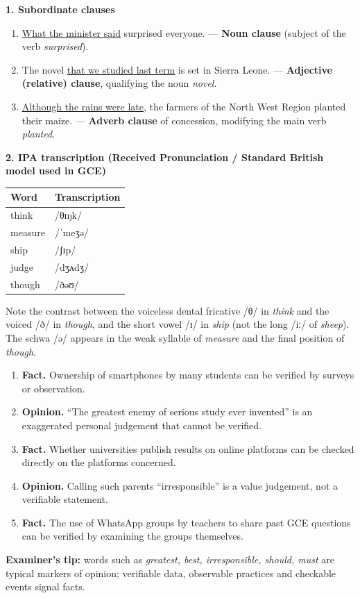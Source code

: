 \documentclass[11pt]{article}
\begin{document}
\begin{corrige}
\textbf{1. Subordinate clauses}
\begin{enumerate}
\item \underline{What the minister said} surprised everyone. — \textbf{Noun clause} (subject of the verb \emph{surprised}).
\item The novel \underline{that we studied last term} is set in Sierra Leone. — \textbf{Adjective (relative) clause}, qualifying the noun \emph{novel}.
\item \underline{Although the rains were late}, the farmers of the North West Region planted their maize. — \textbf{Adverb clause} of concession, modifying the main verb \emph{planted}.
\end{enumerate}
\textbf{2. IPA transcription (Received Pronunciation / Standard British model used in GCE)}
\begin{center}
\begin{tabular}{|l|l|}
\hline
\rowcolor{popblueL} \textbf{Word} & \textbf{Transcription} \\
\hline
think & /θɪŋk/ \\
\hline
measure & /ˈmeʒə/ \\
\hline
ship & /ʃɪp/ \\
\hline
judge & /dʒʌdʒ/ \\
\hline
though & /ðəʊ/ \\
\hline
\end{tabular}
\end{center}
Note the contrast between the voiceless dental fricative /θ/ in \emph{think} and the voiced /ð/ in \emph{though}, and the short vowel /ɪ/ in \emph{ship} (not the long /iː/ of \emph{sheep}). The schwa /ə/ appears in the weak syllable of \emph{measure} and the final position of \emph{though}.
\end{corrige}

\begin{corrige}
\begin{enumerate}
\item \textbf{Fact.} Ownership of smartphones by many students can be verified by surveys or observation.
\item \textbf{Opinion.} ``The greatest enemy of serious study ever invented'' is an exaggerated personal judgement that cannot be verified.
\item \textbf{Fact.} Whether universities publish results on online platforms can be checked directly on the platforms concerned.
\item \textbf{Opinion.} Calling such parents ``irresponsible'' is a value judgement, not a verifiable statement.
\item \textbf{Fact.} The use of WhatsApp groups by teachers to share past GCE questions can be verified by examining the groups themselves.
\end{enumerate}
\textbf{Examiner's tip:} words such as \emph{greatest, best, irresponsible, should, must} are typical markers of opinion; verifiable data, observable practices and checkable events signal facts.
\end{corrige}
\end{document}
